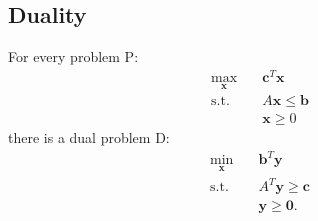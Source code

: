 \subsection*{Duality}

For every problem
P:\begin{align*}
    \max_{\bm{x}} \quad & \bm{c}^{T}\bm{x} \\
    \textrm{s.t.} \quad & A\bm{x} \le \bm{b} \\
      & \bm{x} \ge 0
\end{align*}
there is a dual problem
D:\begin{align*}
    \min_{\bm{x}} \quad & \bm{b}^{T}\bm{y} \\
    \textrm{s.t.} \quad & A^{T}\bm{y}\ge \bm{c} \\
      & \bm{y} \ge \bm{0}
.\end{align*}



